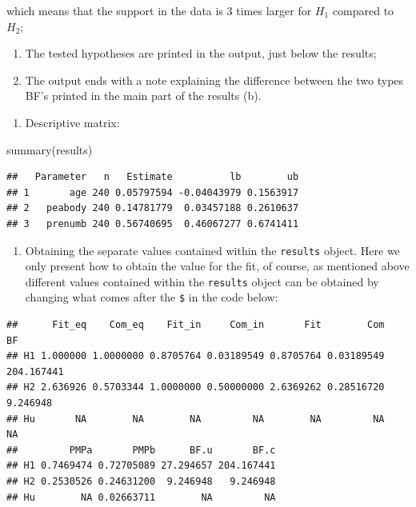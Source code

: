 \documentclass[
]{book}
\newenvironment{Shaded}{\begin{snugshade}}{\end{snugshade}}
\newcommand{\FunctionTok}[1]{\textcolor[rgb]{0.00,0.00,0.00}{#1}}
\newcommand{\NormalTok}[1]{#1}
\newcommand{\SpecialCharTok}[1]{\textcolor[rgb]{0.00,0.00,0.00}{#1}}
\providecommand{\tightlist}{%
  \setlength{\itemsep}{0pt}\setlength{\parskip}{0pt}}
\begin{document}
which means that the support in the data is 3 times larger for \(H_1\) compared to \(H_2\);

\begin{enumerate}
\def\labelenumi{(\alph{enumi})}
\setcounter{enumi}{2}
\tightlist
\item
  The tested hypotheses are printed in the output, just below the results;
\item
  The output ends with a note explaining the difference between the two types BF's printed in the main part of the results (b).
\end{enumerate}

\begin{enumerate}
\def\labelenumi{(\arabic{enumi})}
\setcounter{enumi}{1}
\tightlist
\item
  Descriptive matrix:
\end{enumerate}

\begin{Shaded}
\begin{Highlighting}[]
\FunctionTok{summary}\NormalTok{(results)}
\end{Highlighting}
\end{Shaded}

\begin{verbatim}
##   Parameter   n   Estimate          lb        ub
## 1       age 240 0.05797594 -0.04043979 0.1563917
## 2   peabody 240 0.14781779  0.03457188 0.2610637
## 3   prenumb 240 0.56740695  0.46067277 0.6741411
\end{verbatim}

\begin{enumerate}
\def\labelenumi{(\arabic{enumi})}
\setcounter{enumi}{2}
\tightlist
\item
  Obtaining the separate values contained within the \texttt{results} object. Here we only present how to obtain the value for the fit, of course, as mentioned above different values contained within the \texttt{results} object can be obtained by changing what comes after the \texttt{\$} in the code below:
\end{enumerate}

\begin{Shaded}
\end{Shaded}

\begin{verbatim}
##      Fit_eq    Com_eq    Fit_in     Com_in       Fit        Com         BF
## H1 1.000000 1.0000000 0.8705764 0.03189549 0.8705764 0.03189549 204.167441
## H2 2.636926 0.5703344 1.0000000 0.50000000 2.6369262 0.28516720   9.246948
## Hu       NA        NA        NA         NA        NA         NA         NA
##         PMPa       PMPb      BF.u       BF.c
## H1 0.7469474 0.72705089 27.294657 204.167441
## H2 0.2530526 0.24631200  9.246948   9.246948
## Hu        NA 0.02663711        NA         NA
\end{verbatim}
\end{document}
